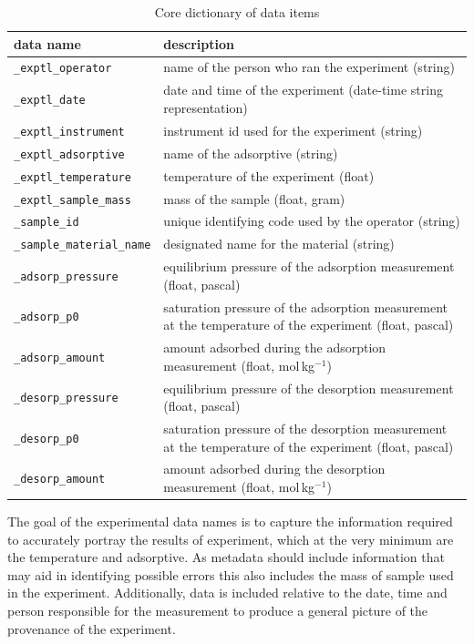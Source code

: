 \documentclass[journal=langd5,manuscript=article]{achemso}
\renewcommand{\arraystretch}{1.2}
\begin{document}
\begin{table}
  \renewcommand{\arraystretch}{1.5}
  \caption{Core dictionary of data items}
  \label{tbl:example}
  \begin{tabular}{lp{7cm}}
    \toprule
    data name & description  \\
    \midrule
    \texttt{\_exptl\_operator}  & name of the person who ran the experiment (string)  \\
    \texttt{\_exptl\_date} & date and time of the experiment (date-time string representation) \\
    \texttt{\_exptl\_instrument}  & instrument id used for the experiment (string)  \\
    \texttt{\_exptl\_adsorptive}  & name of the adsorptive (string)  \\
    \texttt{\_exptl\_temperature}  & temperature of the experiment (float)  \\
    \texttt{\_exptl\_sample\_mass}  & mass of the sample (float, gram) \\
    \texttt{\_sample\_id}  & unique identifying code used by the operator (string)\\
    \texttt{\_sample\_material\_name}  & designated name for the material (string) \\
    \texttt{\_adsorp\_pressure} & equilibrium pressure of the adsorption measurement (float, pascal)\\
    \texttt{\_adsorp\_p0} & saturation pressure of the adsorption measurement at the temperature of the experiment (float, pascal) \\
    \texttt{\_adsorp\_amount} & amount adsorbed during the adsorption measurement (float, mol$\,$kg$^{-1}$) \\
    \texttt{\_desorp\_pressure} & equilibrium  pressure of the desorption measurement (float, pascal) \\
    \texttt{\_desorp\_p0} & saturation pressure of the desorption measurement at the temperature of the experiment (float, pascal) \\
    \texttt{\_desorp\_amount} & amount adsorbed during the desorption measurement (float, mol$\,$kg$^{-1}$) \\
    \bottomrule
  \end{tabular}
\end{table}

The goal of the experimental data names is to capture the information required to accurately portray the results of experiment, which at the very minimum are the temperature and adsorptive.
As metadata should include information that may aid in identifying possible errors this also includes the mass of sample used in the experiment.
Additionally, data is included relative to the date, time and person responsible for the measurement to produce a general picture of the provenance of the experiment.
\end{document}
